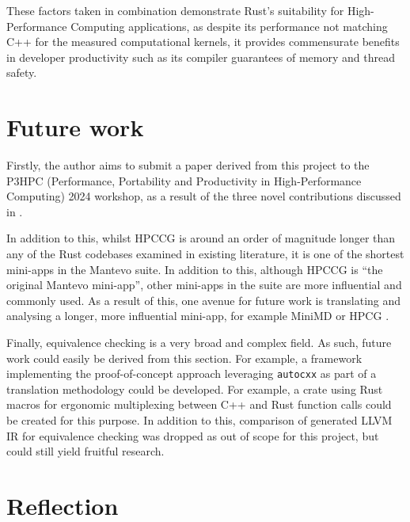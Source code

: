 These factors taken in combination demonstrate Rust's suitability for High-Performance Computing applications, as despite its performance not matching C++ for the measured computational kernels, it provides commensurate benefits in developer productivity such as its compiler guarantees of memory and thread safety.


\section{Future work}
\label{sec:future-work}

Firstly, the author aims to submit a paper derived from this project to the P3HPC (Performance, Portability and Productivity in High-Performance Computing) 2024 workshop, as a result of the three novel contributions discussed in .

In addition to this, whilst HPCCG is around an order of magnitude longer than any of the Rust codebases examined in existing literature, it is one of the shortest mini-apps in the Mantevo suite. In addition to this, although HPCCG is ``the original Mantevo mini-app'', other mini-apps in the suite are more influential and commonly used. As a result of this, one avenue for future work is translating and analysing a longer, more influential mini-app, for example MiniMD \cite{osti_1231191} or HPCG \cite{dongarra2015hpcg}.

Finally, equivalence checking is a very broad and complex field. As such, future work could easily be derived from this section. For example, a framework implementing the proof-of-concept approach leveraging \texttt{autocxx} as part of a translation methodology could be developed. For example, a crate using Rust macros for ergonomic multiplexing between C++ and Rust function calls could be created for this purpose. In addition to this, comparison of generated LLVM IR for equivalence checking was dropped as out of scope for this project, but could still yield fruitful research.



\section{Reflection}
\label{sec:reflection}

